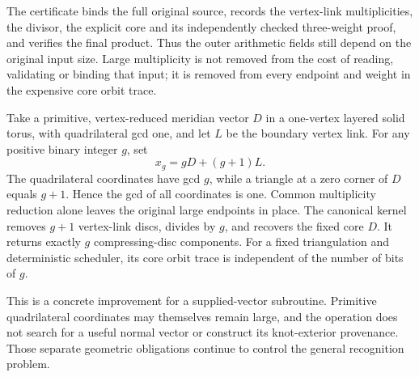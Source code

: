 The certificate binds the full original source, records the vertex-link
multiplicities, the divisor, the explicit core and its independently checked
three-weight proof, and verifies the final product. Thus the outer arithmetic
fields still depend on the original input size. Large multiplicity is not
removed from the cost of reading, validating or binding that input; it is
removed from every endpoint and weight in the expensive core orbit trace.

\begin{example}
Take a primitive, vertex-reduced meridian vector $D$ in a one-vertex layered
solid torus, with quadrilateral gcd one, and let $L$ be the boundary vertex
link. For any positive binary integer $g$, set
\[
 x_g=gD+(g+1)L.
\]
The quadrilateral coordinates have gcd $g$, while a triangle at a zero corner
of $D$ equals $g+1$. Hence the gcd of all coordinates is one. Common
multiplicity reduction alone leaves the original large endpoints in place.
The canonical kernel removes $g+1$ vertex-link discs, divides by $g$, and
recovers the fixed core $D$. It returns exactly $g$ compressing-disc
components. For a fixed triangulation and deterministic scheduler, its core
orbit trace is independent of the number of bits of $g$.
\end{example}

This is a concrete improvement for a supplied-vector subroutine. Primitive
quadrilateral coordinates may themselves remain large, and the operation
does not search for a useful normal vector or construct its knot-exterior
provenance. Those separate geometric obligations continue to control the
general recognition problem.
